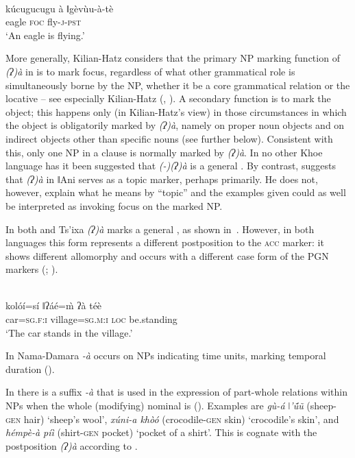 \documentclass[output=paper]{LSP/langsci}
\begin{document}
\ea{}\\\label{09-mc-ex:12} 
\gll kúcugucugu à ǁgèvùu-à-tè \\
eagle \textsc{foc} fly-\textsc{j}-\textsc{pst}\\
\glt ‘An eagle is flying.’ 
\z

More generally, Kilian-Hatz considers that the primary NP marking function of \textit{(ʔ)à} in  is to mark focus, regardless of what other grammatical role is simultaneously borne by the NP, whether it be a core grammatical relation or the locative – see especially Kilian-Hatz (\citeyear[54]{Kilian-Hatz2008Grammar}, \citeyear[370, 377]{Kilian-Hatz2013Kxoe}). A secondary function is to mark the object; this happens only (in Kilian-Hatz’s view) in those circumstances in which the object is obligatorily marked by \textit{(ʔ)à}, namely on proper noun objects and on indirect objects other than specific nouns (see further  below). Consistent with this, only one NP in a clause is normally marked by \textit{(ʔ)à}. In no other Khoe language has it been suggested that \textit{(-)(ʔ)à} is a general . By contrast, \citet[31, 67, 68]{Heine1999Ani} suggests that \textit{(ʔ)à} in ǁAni serves as a topic marker, perhaps primarily. He does not, however, explain what he means by “topic” and the examples given could as well be interpreted as invoking focus on the marked NP.

In both  and Ts’ixa \textit{(ʔ)à} marks a general , as shown in~. However, in both languages this form represents a different postposition to the \textsc{acc} marker: it shows different allomorphy and occurs with a different case form of the PGN markers (\citealt[202]{Fehn2014Grammar}; \citealt{McGregor2015Optional}).

\ea {}\\\label{09-mc-ex:13} 
\gll kolóí=sí ǁʔáé=\`{m} ʔà téè \\
car=\textsc{sg.f:i} village=\textsc{sg.m:i} \textsc{loc} be.standing\\
\glt ‘The car stands in the village.’
\z

In Nama-Damara \textit{-à} occurs on NPs indicating time units, marking temporal duration (\citealt[112, 199]{Hagman1973Nama}).

In  there is a  suffix \textit{-à} that is used in the expression of part-whole relations within NPs when the whole (modifying) nominal is  (\citealt[77]{Kilian-Hatz2008Grammar}). Examples are \textit{gù-á ǀ’ṹũ} (sheep-\textsc{gen} hair) ‘sheep’s wool’, \textit{xúni-a khòó} (crocodile-\textsc{gen} skin) ‘crocodile’s skin’, and \textit{hémpè-à píì} (shirt-\textsc{gen} pocket) ‘pocket of a shirt’. This is cognate with the postposition \textit{(ʔ)à} according to \citet[55]{Kilian-Hatz2008Grammar}.
\end{document}

